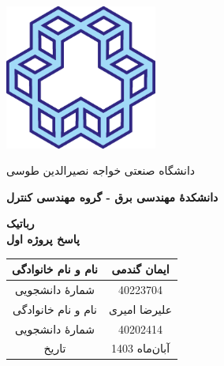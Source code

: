 \begin{titlepage}
\begin{center}
\centerline{{\includegraphics[width=5cm]{img/Logo.png}}}
\centerline{\textcolor[rgb]{0,0,0.5}{\nast \large  دانشگاه صنعتی خواجه نصیرالدین طوسی}}
\centerline{\textcolor[rgb]{0,0,0.5}{\nast \bfseries دانشکدۀ مهندسی برق - گروه مهندسی کنترل}}

\vfill
        
\Huge
\textbf{رباتیک}\\
\textbf{پاسخ پروژه اول}\\
        
\vfill
        
\begin{table}[ht]
    \centering
    \huge
    \begin{tabular}{|c|c|}
    \hline
    نام و نام خانوادگی &  ایمان گندمی\\
    \hline
    شمارۀ دانشجویی &40223704\\
    \hline
    نام و نام خانوادگی &   علیرضا امیری\\
    \hline
    شمارۀ دانشجویی &40202414\\
    \hline
    تاریخ & آبان‌ماه 1403\\
    \hline
    \end{tabular}
\end{table}
\end{center}
\end{titlepage}
